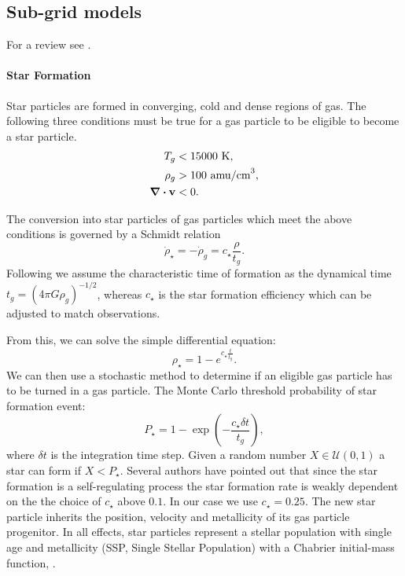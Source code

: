 \subsection{Sub-grid models}
For a review see \citet{Verbeke2017, Vandenbroucke2016}.

\paragraph{Star Formation}
\label{sec:star_formation}
Star particles are formed in converging, cold and dense regions of gas.
The following three conditions must be true for a gas particle to be eligible to become a star particle.
\begin{align*}
 T_g &< 15000 \text{~K},\\
 \rho_g &> 100 \text{~amu/cm}^{3},\\
 \div \boldsymbol{\mathbf{v}} & < 0.
\end{align*}

The conversion into star particles of gas particles which meet the above conditions is governed by a Schmidt relation \citep{Schmidt1959}
\begin{equation}                                                                              
\dot{\rho}_\star = -\dot{\rho}_g = c_\star \frac{\rho}{t_g}.
\label{eq:schmidt_relation}
\end{equation}
Following \citet{Stinson2006} we assume the characteristic time of formation as the dynamical time $t_g = (4 \pi G \rho_g)^{-1/2}$, whereas $c_\star$ is the star formation efficiency which can be adjusted to match observations.

From this, we can solve the simple differential equation: 
\begin{equation}
\rho_\star = 1 - e^{c_\star \frac{t}{t_g}}.
\end{equation}
We can then use a stochastic method to determine if an eligible gas particle has to be turned in a gas particle.
The Monte Carlo threshold probability of star formation event:
\begin{equation}
P_\star = 1-\exp(-\frac{c_\star \delta t}{t_g}),
\end{equation}
where $\delta t$ is the integration time step.
Given a random number $X \in \mathcal{U}(0,1)$ a star can form if $X < P_\star$.
Several authors \citep{Stinson2006, Revaz2009, Cloet-Osselaer2012} have pointed out that since the star formation is a self-regulating process the star formation rate is weakly dependent on the the choice of $c_\star$ above $0.1$. In our case we use $c_\star = 0.25$.
The new star particle inherits the position, velocity and metallicity of its gas particle progenitor.
In all effects, star particles represent a stellar population with single age and metallicity (SSP, Single Stellar Population) with a Chabrier initial-mass function, \citet{Chabrier2003}.

